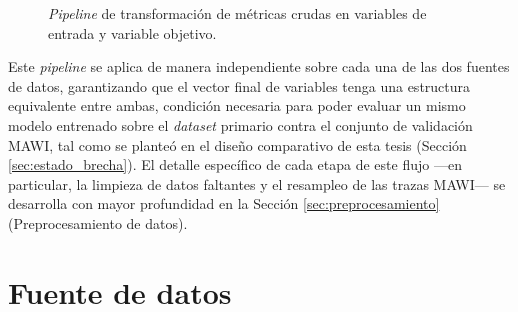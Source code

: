 \documentclass[12pt]{report}
\begin{document}
\begin{figure}[H]
    \centering
    \caption{\textit{Pipeline} de transformación de métricas crudas en variables de entrada y variable objetivo.}
    \label{fig:pipeline_features}
\end{figure}

Este \textit{pipeline} se aplica de manera independiente sobre cada una de las dos fuentes de datos, garantizando que el vector final de variables tenga una estructura equivalente entre ambas, condición necesaria para poder evaluar un mismo modelo entrenado sobre el \textit{dataset} primario contra el conjunto de validación MAWI, tal como se planteó en el diseño comparativo de esta tesis (Sección \ref{sec:estado_brecha}). El detalle específico de cada etapa de este flujo ---en particular, la limpieza de datos faltantes y el resampleo de las trazas MAWI--- 
se desarrolla con mayor profundidad en la Sección \ref{sec:preprocesamiento} (Preprocesamiento de datos).

\section{Fuente de datos}
\label{sec:fuente_datos}
\end{document}

